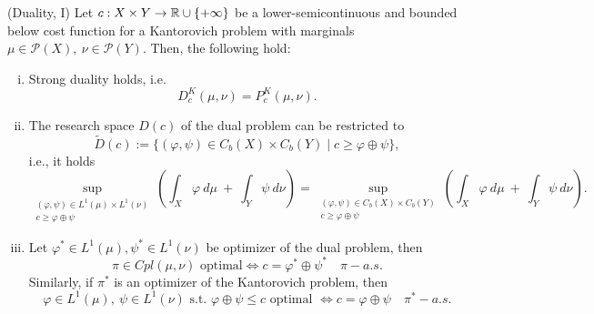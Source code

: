 \documentclass[../main.tex]{subfiles}
\begin{document}
\begin{theorem}
\label{thm:strong_duality} (Duality, I)
    Let $c: X\times Y\to \mathbb{R}\cup\{+\infty\}$ be a lower-semicontinuous and bounded below cost function for a Kantorovich problem with marginals $\mu\in\mathcal{P}(X), \ \nu\in\mathcal{P}(Y)$. Then, the following hold: 
    \begin{enumerate}[(i)]
        \item Strong duality holds, i.e. $$D^K_c(\mu, \nu) = P^K_c(\mu, \nu).$$
        \item The research space $D(c)$ of the dual problem can be restricted to $$\tilde D(c) := \{(\varphi, \psi)\in C_b(X)\times C_b(Y)\mid c\geq \varphi\oplus\psi\},$$ i.e., it holds
    $$
    \sup_{\substack{(\varphi, \psi)\in L^1(\mu)\times L^1(\nu) \\ c\geq \varphi\oplus\psi}} \left(\int_X \varphi \ d\mu \ + \ \int_Y \psi \ d\nu \right)
    =
    \sup_{\substack{(\varphi, \psi)\in C_b(X)\times C_b(Y) \\ c\geq \varphi\oplus\psi}} \left(\int_X \varphi \ d\mu \ + \ \int_Y \psi \ d\nu \right).
    $$
    \item Let $\varphi^*\in L^1(\mu), \psi^*\in L^1(\nu)$ be optimizer of the dual problem, then
    $$
    \pi\in Cpl(\mu, \nu) \text{ optimal} \iff c = \varphi^* \oplus \psi^* \quad \pi-a.s.
    $$
    Similarly, if $\pi^*$ is an optimizer of the Kantorovich problem, then
    $$
    \varphi\in L^1(\mu), \ \psi\in L^1(\nu) \text{ s.t. $\varphi\oplus\psi\leq c$ optimal } \iff c = \varphi \oplus \psi \quad \pi^*-a.s.
    $$
    \end{enumerate}
\end{theorem}
\end{document}
